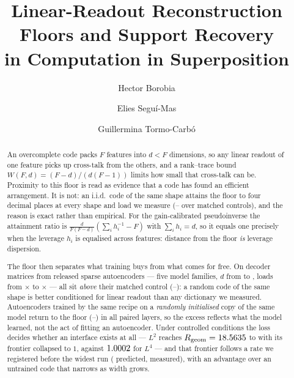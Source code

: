 \documentclass[preprint,12pt]{elsarticle}
\theoremstyle{definition}
\begin{document}
\begin{frontmatter}

\title{Linear-Readout Reconstruction Floors and Support Recovery\\ in Computation in Superposition}

\author[inst1]{Hector Borobia}
\author[inst2]{Elies Segu\'i-Mas}
\author[inst3]{Guillermina Tormo-Carb\'o}


\begin{abstract}
An overcomplete code packs $F$ features into $d<F$ dimensions, so any linear readout of one feature
picks up cross-talk from the others, and a rank--trace bound $W(F,d)=(F-d)/(d(F-1))$ limits how
small that cross-talk can be. Proximity to this floor is read as evidence that a code has found an
efficient arrangement. It is not: an i.i.d.\ code of the same shape attains the floor to four
decimal places at every shape and load we measure (\SaeCtlRgeomMin--\SaeCtlRgeomMax{} over
\SaeControls{} matched controls), and the reason is exact rather than empirical. For the gain-calibrated
pseudoinverse the attainment ratio is $\frac{d}{F(F-d)}\left(\sum_i h_i^{-1}-F\right)$ with
$\sum_i h_i=d$, so it equals one precisely when the leverage $h_i$ is equalised across features:
distance from the floor \emph{is} leverage dispersion.

The floor then separates what training buys from what comes for free. On
\SaeDicts{} decoder matrices from released sparse autoencoders --- five model families, $d$ from
\SaeDMin{} to \SaeDMax{}, loads from \SaeLoadMin$\times$ to \SaeLoadMax$\times$ --- all
\SaeDictsAboveControl{} sit \emph{above} their matched control
(\SaeDictRgeomMin--\SaeDictRgeomMax): a random code of the same shape is better conditioned for
linear readout than any dictionary we measured. Autoencoders trained by the same recipe on a
\emph{randomly initialised} copy of the same model return to the floor
(\SaeRandInitRgeomMin--\SaeRandInitRgeomMax) in all \SaePairedLayers{} paired layers, so the excess
reflects what the model learned, not the act of fitting an autoencoder. Under controlled conditions
the loss decides whether an interface exists at all --- $L^2$ reaches
$R_{\mathrm{geom}}=18.5635$ to \ScLtwoRgeom{} with its frontier collapsed to $1$, against
$1.0002$ for $L^4$ --- and that frontier follows a rate we registered before the
widest run (\ScRegistered{} predicted, \ScMeasured{} measured), with an advantage over an untrained
code that narrows as width grows.


\end{abstract}
\end{frontmatter}
\end{document}
